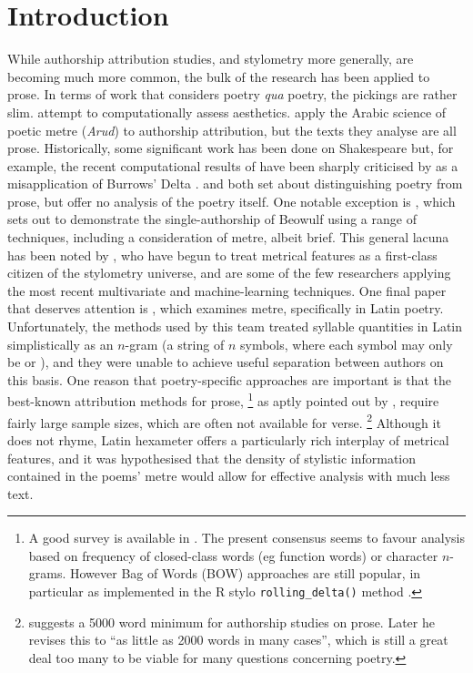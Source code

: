 \documentclass[11pt,a4paper]{scrartcl} %
\begin{document}
\setlength{\parindent}{0.3in}\section{Introduction}
While authorship attribution studies, and stylometry more generally, are becoming much more common, the bulk of the research has been applied to prose. In terms of work that considers poetry \textit{qua} poetry, the pickings are rather slim.  attempt to computationally assess aesthetics.  apply the Arabic science of poetic metre (\textit{Arud}) to authorship attribution, but the texts they analyse are all prose. Historically, some significant work has been done on Shakespeare but, for example, the recent computational results of  have been sharply criticised by  as a misapplication of Burrows' Delta \cite{burrows_delta:_2002}.  and  both set about distinguishing poetry from prose, but offer no analysis of the poetry itself. One notable exception is , which sets out to demonstrate the single-authorship of Beowulf using a range of techniques, including a consideration of metre, albeit brief. This general lacuna has been noted by , who have begun to treat metrical features as a first-class citizen of the stylometry universe, and are some of the few researchers applying the most recent multivariate and machine-learning techniques. One final paper that deserves attention is , which examines metre, specifically in Latin poetry. Unfortunately, the methods used by this team treated syllable quantities in Latin simplistically as an $n$-gram (a string of $n$ symbols, where each symbol may only be  or \metricsymbols{_}), and they were unable to achieve useful separation between authors on this basis. One reason that poetry-specific approaches are important is that the best-known attribution methods for prose,%
%
\footnote{A good survey is available in . The present consensus seems to favour analysis based on frequency of closed-class words (eg function words) or character $n$-grams. However Bag of Words (BOW) approaches are still popular, in particular as implemented in the R stylo \texttt{rolling\_delta()} method .}
as aptly pointed out by , require fairly large sample sizes, which are often not available for verse.%
%
\footnote{ suggests a 5000 word minimum for authorship studies on prose. Later \citeyear[4]{eder_short_2017} he revises this to ``as little as 2000 words in many cases'', which is still a great deal too many to be viable for many questions concerning poetry.\label{edernote}}
%
Although it does not rhyme, Latin hexameter offers a particularly rich interplay of metrical features, and it was hypothesised that the density of stylistic information contained in the poems' metre would allow for effective analysis with much less text.
\end{document}
